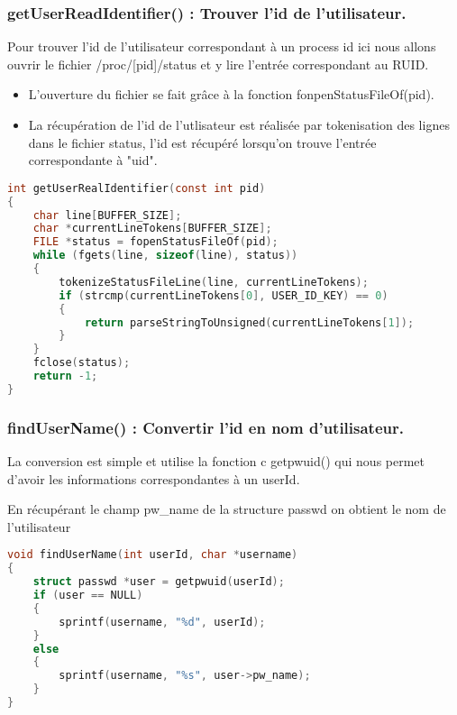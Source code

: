 \subsubsection{getUserReadIdentifier() : Trouver l'id de l'utilisateur.}
Pour trouver l'id de l'utilisateur correspondant à un process id ici nous allons ouvrir le fichier /proc/[pid]/status et y lire l'entrée correspondant au RUID.

\begin{itemize}
\item L'ouverture du fichier se fait grâce à la fonction fonpenStatusFileOf(pid).

\item La récupération de l'id de l'utlisateur est réalisée par tokenisation des lignes dans le fichier status, l'id est récupéré lorsqu'on trouve l'entrée correspondante à "uid".
\end{itemize}

\begin{lstlisting}[frame=single, language=c]
int getUserRealIdentifier(const int pid)
{
    char line[BUFFER_SIZE];
    char *currentLineTokens[BUFFER_SIZE];
    FILE *status = fopenStatusFileOf(pid);
    while (fgets(line, sizeof(line), status))
    {
        tokenizeStatusFileLine(line, currentLineTokens);
        if (strcmp(currentLineTokens[0], USER_ID_KEY) == 0)
        {
            return parseStringToUnsigned(currentLineTokens[1]);
        }
    }
    fclose(status);
    return -1;
}
\end{lstlisting}

\subsubsection{findUserName() : Convertir l'id en nom d'utilisateur.}
La conversion est simple et utilise la fonction c getpwuid() qui nous permet d'avoir les informations correspondantes à un userId.

En récupérant le champ pw\_name de la structure passwd on obtient le nom de l'utilisateur

\begin{lstlisting}[frame=single, language=c]
void findUserName(int userId, char *username)
{
    struct passwd *user = getpwuid(userId);
    if (user == NULL)
    {
        sprintf(username, "%d", userId);
    }
    else
    {
        sprintf(username, "%s", user->pw_name);
    }
}
\end{lstlisting}